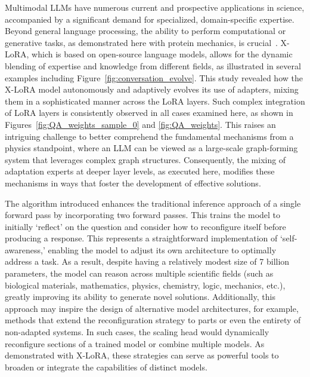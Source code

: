 Multimodal LLMs have numerous current and prospective applications in science, accompanied by a significant demand for specialized, domain-specific expertise. Beyond general language processing, the ability to perform computational or generative tasks, as demonstrated here with protein mechanics, is crucial~\cite{Luu2023BioinspiredLLM:Materials,Buehler2023MechGPTModalities,Buehler2023MeLMProblemsb}. X-LoRA, which is based on open-source language models, allows for the dynamic blending of expertise and knowledge from different fields, as illustrated in several examples including Figure~\ref{fig:conversation_evolve}. This study revealed how the X-LoRA model autonomously and adaptively evolves its use of adapters, mixing them in a sophisticated manner across the LoRA layers. Such complex integration of LoRA layers is consistently observed in all cases examined here, as shown in Figures~\ref{fig:QA_weights_sample_0} and \ref{fig:QA_weights}. This raises an intriguing challenge to better comprehend the fundamental mechanisms from a physics standpoint, where an LLM can be viewed as a large-scale graph-forming system that leverages complex graph structures. Consequently, the mixing of adaptation experts at deeper layer levels, as executed here, modifies these mechanisms in ways that foster the development of effective solutions.

The algorithm introduced enhances the traditional inference approach of a single forward pass by incorporating two forward passes. This trains the model to initially `reflect' on the question and consider how to reconfigure itself before producing a response. This represents a straightforward implementation of ‘self-awareness,’ enabling the model to adjust its own architecture to optimally address a task. As a result, despite having a relatively modest size of 7 billion parameters, the model can reason across multiple scientific fields (such as biological materials, mathematics, physics, chemistry, logic, mechanics, etc.), greatly improving its ability to generate novel solutions. Additionally, this approach may inspire the design of alternative model architectures, for example, methods that extend the reconfiguration strategy to parts or even the entirety of non-adapted systems. In such cases, the scaling head would dynamically reconfigure sections of a trained model or combine multiple models. As demonstrated with X-LoRA, these strategies can serve as powerful tools to broaden or integrate the capabilities of distinct models.

